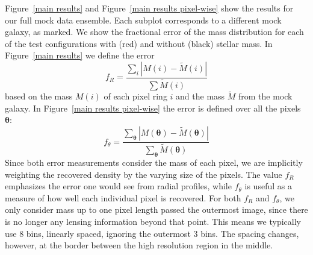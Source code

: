 \documentclass[galley,usenatbib]{mn2e}
\renewcommand{\vec}[1]{\ensuremath{\boldsymbol{#1}}}
\newcommand{\figref}[1] {Figure~\ref{#1}}
\begin{document}
\figref{main results} and \figref{main results pixel-wise} show the results for
our full mock data ensemble. Each subplot corresponds to a different mock
galaxy, as marked. We show the fractional error of the mass distribution for
each of the test configurations with (red) and without (black) stellar mass. In
\figref{main results} we define the error
%
\begin{equation} \label{ferror R}
  f_R = \frac {\sum_i \left|M(i) - \tilde M(i)\right| } {\sum \tilde M(i)}
\end{equation}
%
based on the mass $M(i)$ of each pixel ring $i$ and the mass $\tilde M$ from the mock galaxy. 
In \figref{main results pixel-wise} the error is defined over all the pixels $\vec\theta$:
%
\begin{equation} \label{ferror theta}
f_\theta = \frac {\sum_{\vec\theta} \left|M(\vec\theta) - \tilde M(\vec\theta)\right| } {\sum_{\vec\theta} \tilde M(\vec\theta)}
\end{equation}
%
Since both error measurements consider the mass of each pixel, we are
implicitly weighting the recovered density by the varying size of the pixels.
The value $f_R$ emphasizes the error one would see from radial profiles, while
$f_\theta$ is useful as a measure of how well each individual pixel is recovered.
For both $f_R$ and $f_\theta$, we only consider mass up to one pixel length passed the
outermost image, since there is no longer any lensing information beyond that
point. This means we typically use 8 bins, linearly spaced, ignoring the
outermost 3 bins.  The spacing changes, however, at the border between the high
resolution region in the middle.
\end{document}
